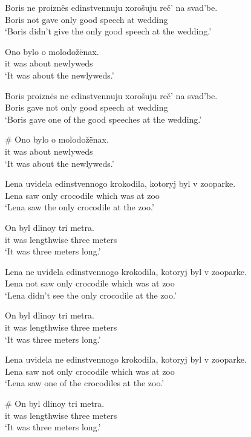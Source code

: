 \begin{exe}
	\ex \begin{xlist}
		\ex \gll Boris ne proizn\"{e}s edinstvennuju xoro\v{s}uju re\v{c}' na svad'be.\\
		Boris not gave only good speech at wedding\\
		\glt `Boris didn't give the only good speech at the wedding.'
		
		\ex \gll Ono bylo o molodo\v{z}\"{e}nax.\\
		it was about newlyweds\\
		\glt `It was about the newlyweds.'
	\end{xlist}
	
	\ex \begin{xlist}
		\ex \gll Boris proizn\"{e}s ne edinstvennuju xoro\v{s}uju re\v{c}' na svad'be.\\
		Boris gave not only good speech at wedding\\
		\glt `Boris gave one of the good speeches at the wedding.'
		
		\ex \gll \# Ono bylo o molodo\v{z}\"{e}nax.\\
		{} it was about newlyweds\\
		\glt `It was about the newlyweds.'
	\end{xlist}

	\ex \begin{xlist}
		\ex \gll Lena uvidela edinstvennogo krokodila, kotoryj byl v zooparke.\\
		Lena saw only crocodile which was at zoo\\
		\glt `Lena saw the only crocodile at the zoo.'
		
		\ex \gll On byl dlinoy tri metra.\\
		it was lengthwise three meters\\
		\glt `It was three meters long.'
	\end{xlist}

	\ex \begin{xlist}
		\ex \gll Lena ne uvidela edinstvennogo krokodila, kotoryj byl v zooparke.\\
		Lena not saw only crocodile which was at zoo\\
		\glt `Lena didn't see the only crocodile at the zoo.'
		
		\ex \gll On byl dlinoy tri metra.\\
		it was lengthwise three meters\\
		\glt `It was three meters long.'
	\end{xlist}
	
	\ex \begin{xlist}
		\ex \gll Lena uvidela ne edinstvennogo krokodila, kotoryj byl v zooparke.\\
		Lena saw not only crocodile which was at zoo\\
		\glt `Lena saw one of the crocodiles at the zoo.'
		
		\ex \gll \# On byl dlinoy tri metra.\\
		{} it was lengthwise three meters\\
		\glt `It was three meters long.'
	\end{xlist}
\end{exe}


